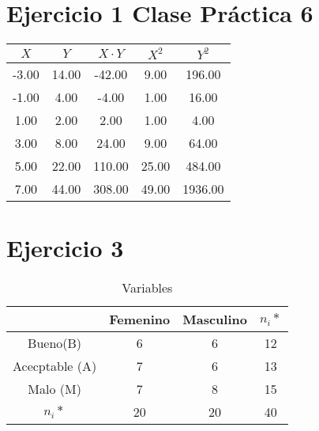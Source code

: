 \documentclass{article}
\begin{document}
	\section*{Ejercicio 1 Clase Pr\'actica 6 }
	
	\begin{table}[ht]
		\centering		
		\begin{tabular}{|ccccc|}
			\hline
			\rowcolor[gray]{0.8} $X$ & $Y$ & $X\cdot Y$ & $X^2$ & $Y^2$ \\ 
			\hline
			-3.00 & 14.00 & -42.00 & 9.00 & 196.00 \\ 
			-1.00 & 4.00 & -4.00 & 1.00 & 16.00 \\ 
			1.00 & 2.00 & 2.00 & 1.00 & 4.00 \\ 
			3.00 & 8.00 & 24.00 & 9.00 & 64.00 \\ 
			5.00 & 22.00 & 110.00 & 25.00 & 484.00 \\ 
			\hline
			\rowcolor[gray]{0.9} 7.00 & 44.00 & 308.00 & 49.00 & 1936.00 \\ 
			\hline
		\end{tabular}
	\end{table}

	\section*{Ejercicio 3}
		\begin{table}
		\caption{Variables}
		\centering
		\begin{tabular}{|c|c|c|c|}
			\hline 
			& Femenino & Masculino & $n_{i}*$ \\
			\hline
			Bueno(B) & 6 & 6 & 12 \\
			\hline
			Acecptable (A) & 7 & 6 & 13 \\
			\hline
			Malo (M) & 7 & 8 & 15 \\
			\hline
			$n_{i}*$ & 20 & 20 & 40 \\
			\hline
		\end{tabular}
		\end{table}
\end{document}
